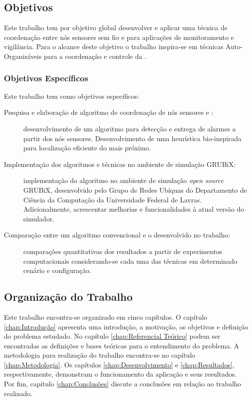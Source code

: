 \subsection{Objetivos}

Este trabalho tem por objetivo global desenvolver e aplicar uma técnica de
coordenação entre nós sensores sem fio e \uavs para aplicações de monitoramento
e vigilância. Para o alcance deste objetivo o trabalho inspira-se em técnicas
Auto-Organizáveis para a coordenação e controle da \rssf.

\subsubsection{Objetivos Específicos}

Este trabalho tem como objetivos específicos:

\begin{description}

	\item [Pesquisa e elaboração de algoritmo de coordenação de nós
sensores e \vants:] desenvolvimento de um algoritmo para detecção e entrega de
alarmes a partir dos nós sensores. Desenvolvimento de uma heurística
bio-inspirada para localização eficiente do \uav mais próximo.

	\item [Implementação dos algoritmos e técnicas no ambiente de simulação
GRUBiX:] implementação do algoritmo no ambiente de simulação
\emph{open source} GRUBiX, desenvolvido pelo Grupo de Redes Ubíquas do
Departamento de Ciência da Computação da Universidade Federal de Lavras.
Adicionalmente, acrescentar melhorias e funcionalidades à atual versão do
simulador.

	\item [Comparação entre um algoritmo convencional e o desenvolvido no
trabalho:] comparações quantitativas dos resultados a partir de experimentos
computacionais considerando-se cada uma das técnicas em determinado cenário e configuração.

\end{description}

%
\subsection{Organização do Trabalho}

Este trabalho encontra-se organizado em cinco capítulos. O capítulo
\ref{chap:Introdução} apresenta uma introdução, a motivação, os objetivos e
definição do problema estudado. No capítulo \ref{chap:Referencial Teórico} podem
ser encontradas as definições e bases teóricas para o entendimento do problema.
A metodologia para realização do trabalho encontra-se no capítulo
\ref{chap:Metodologia}. Os capítulos \ref{chap:Desenvolvimento} e
\ref{chap:Resultados}, respectivamente, demonstram o funcionamento da aplicação e seus resultados. Por fim, capítulo \ref{chap:Conclusões} discute a conclusões em relação ao trabalho realizado.


